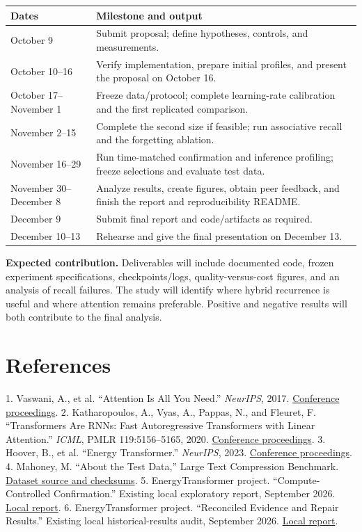 \documentclass[11pt,letterpaper]{article}
\begin{document}
\smallskip\begin{tabularx}{\textwidth}{@{}p{3.2cm}X@{}}\toprule
\textbf{Dates} & \textbf{Milestone and output}\\\midrule
October 9 & Submit proposal; define hypotheses, controls, and measurements.\\
October 10–16 & Verify implementation, prepare initial profiles, and present the proposal on October 16.\\
October 17–November 1 & Freeze data/protocol; complete learning-rate calibration and the first replicated comparison.\\
November 2–15 & Complete the second size if feasible; run associative recall and the forgetting ablation.\\
November 16–29 & Run time-matched confirmation and inference profiling; freeze selections and evaluate test data.\\
November 30–December 8 & Analyze results, create figures, obtain peer feedback, and finish the report and reproducibility README.\\
December 9 & Submit final report and code/artifacts as required.\\
December 10–13 & Rehearse and give the final presentation on December 13.\\
\bottomrule\end{tabularx}\smallskip

\textbf{Expected contribution.} Deliverables will include documented code, frozen experiment specifications, checkpoints/logs, quality-versus-cost figures, and an analysis of recall failures. The study will identify where hybrid recurrence is useful and where attention remains preferable. Positive and negative results will both contribute to the final analysis.

\newpage
\section*{References}

1. Vaswani, A., et al. “Attention Is All You Need.” \emph{NeurIPS}, 2017. \href{https://proceedings.neurips.cc/paper/2017/hash/3f5ee243547dee91fbd053c1c4a845aa-Abstract.html}{Conference proceedings}.
2. Katharopoulos, A., Vyas, A., Pappas, N., and Fleuret, F. “Transformers Are RNNs: Fast Autoregressive Transformers with Linear Attention.” \emph{ICML}, PMLR 119:5156–5165, 2020. \href{https://proceedings.mlr.press/v119/katharopoulos20a.html}{Conference proceedings}.
3. Hoover, B., et al. “Energy Transformer.” \emph{NeurIPS}, 2023. \href{https://proceedings.neurips.cc/paper_files/paper/2023/hash/57a9b97477b67936298489e3c1417b0a-Abstract-Conference.html}{Conference proceedings}.
4. Mahoney, M. “About the Test Data,” Large Text Compression Benchmark. \href{https://mattmahoney.net/dc/textdata.html}{Dataset source and checksums}.
5. EnergyTransformer project. “Compute-Controlled Confirmation.” Existing local exploratory report, September 2026. \href{../reports/compute_confirmation/REPORT.md}{Local report}.
6. EnergyTransformer project. “Reconciled Evidence and Repair Results.” Existing local historical-results audit, September 2026. \href{../FINDINGS.md}{Local report}.
\end{document}
